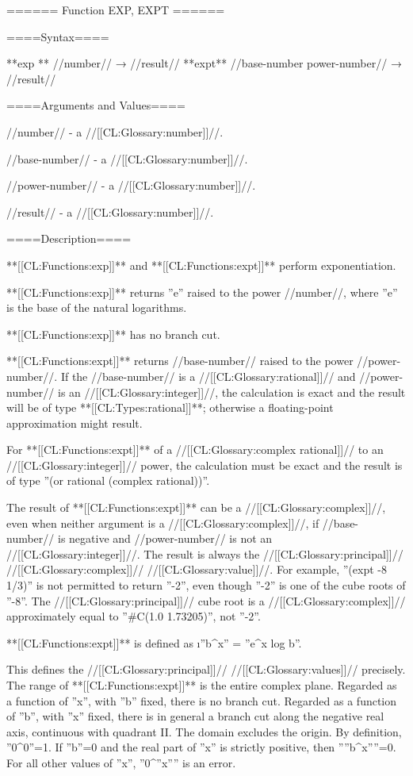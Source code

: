 ====== Function EXP, EXPT ======

====Syntax====

**exp ** //number// → //result// **expt** //base-number power-number// → //result//

====Arguments and Values====

//number// - a //[[CL:Glossary:number]]//.

//base-number// - a //[[CL:Glossary:number]]//.

//power-number// - a //[[CL:Glossary:number]]//.

//result// - a //[[CL:Glossary:number]]//.

====Description====

**[[CL:Functions:exp]]** and **[[CL:Functions:expt]]** perform exponentiation.

**[[CL:Functions:exp]]** returns ''e'' raised to the power //number//, where ''e'' is the base of the natural logarithms.

**[[CL:Functions:exp]]** has no branch cut.

**[[CL:Functions:expt]]** returns //base-number// raised to the power //power-number//. If the //base-number// is a //[[CL:Glossary:rational]]// and //power-number// is an //[[CL:Glossary:integer]]//, the calculation is exact and the result will be of type **[[CL:Types:rational]]**; otherwise a floating-point approximation might result.

For **[[CL:Functions:expt]]** of a //[[CL:Glossary:complex rational]]// to an //[[CL:Glossary:integer]]// power, the calculation must be exact and the result is of type ''(or rational (complex rational))''.



The result of **[[CL:Functions:expt]]** can be a //[[CL:Glossary:complex]]//, even when neither argument is a //[[CL:Glossary:complex]]//, if //base-number// is negative and //power-number// is not an //[[CL:Glossary:integer]]//. The result is always the //[[CL:Glossary:principal]]// //[[CL:Glossary:complex]]// //[[CL:Glossary:value]]//. For example, ''(expt -8 1/3)'' is not permitted to return ''-2'', even though ''-2'' is one of the cube roots of ''-8''. The //[[CL:Glossary:principal]]// cube root is a //[[CL:Glossary:complex]]// approximately equal to ''#C(1.0 1.73205)'', not ''-2''.

**[[CL:Functions:expt]]** is defined as \i{''b^x'' = ''e^{x log b\/}''}.

This defines the //[[CL:Glossary:principal]]// //[[CL:Glossary:values]]// precisely. The range of **[[CL:Functions:expt]]** is the entire complex plane. Regarded as a function of ''x'', with ''b'' fixed, there is no branch cut. Regarded as a function of ''b'', with ''x'' fixed, there is in general a branch cut along the negative real axis, continuous with quadrant II. The domain excludes the origin. By definition, ''0^0''=1. If ''b''=0 and the real part of ''x'' is strictly positive, then ''''b^x''''=0. For all other values of ''x'', ''0^''x'''' is an error.

